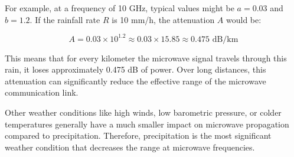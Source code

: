 For example, at a frequency of 10 GHz, typical values might be \( a = 0.03 \) and \( b = 1.2 \). If the rainfall rate \( R \) is 10 mm/h, the attenuation \( A \) would be:

\[
A = 0.03 \times 10^{1.2} \approx 0.03 \times 15.85 \approx 0.475 \text{ dB/km}
\]

This means that for every kilometer the microwave signal travels through this rain, it loses approximately 0.475 dB of power. Over long distances, this attenuation can significantly reduce the effective range of the microwave communication link.

Other weather conditions like high winds, low barometric pressure, or colder temperatures generally have a much smaller impact on microwave propagation compared to precipitation. Therefore, precipitation is the most significant weather condition that decreases the range at microwave frequencies.

